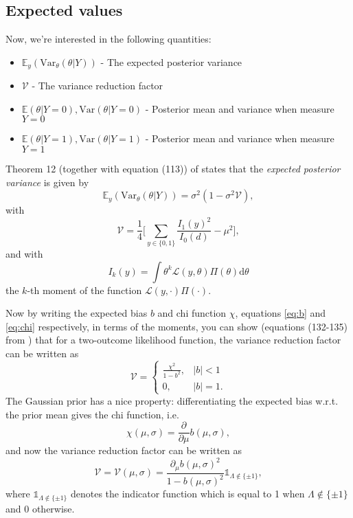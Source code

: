 \documentclass[]{report}
\begin{document}
\subsection{Expected values}
Now, we're interested in the following quantities:
\begin{itemize}
    \item $\mathbb{E}_y(\text{Var}_{\theta}(\theta | Y))$ - The expected posterior variance
    \item $\mathcal{V}$ - The variance reduction factor
    \item $\mathbb{E}(\theta | Y=0), \text{Var}(\theta|Y=0)$ - Posterior mean and variance when measure $Y=0$
    \item $\mathbb{E}(\theta | Y=1), \text{Var}(\theta|Y=1)$ - Posterior mean and variance when measure $Y=1$
\end{itemize}

Theorem 12 (together with equation (113)) of \cite{Koh2020} states that the \textit{expected posterior variance} is given by
\begin{equation}
    \mathbb{E}_y(\text{Var}_{\theta}(\theta | Y)) = \sigma^2(1-\sigma^2\mathcal{V}),
\end{equation}
with
\begin{equation}
    \mathcal{V} = \frac{1}{4}\Bigg[ \sum_{y\in \{0,1\}}\frac{I_1(y)^2}{I_0(d)} - \mu^2\Bigg],
\end{equation}
and with
\begin{equation}
    I_k(y) = \int \theta^k \mathcal{L}(y, \theta)\Pi(\theta) \text{d}\theta
\end{equation}
the $k$-th moment of the function $\mathcal{L}(y, \cdot)\Pi(\cdot)$.

Now by writing the expected bias $b$ and chi function $\chi$, equations \eqref{eq:b} and \eqref{eq:chi} respectively, in terms of the moments, you can show (equations (132-135) from \cite{Koh2020}) that for a two-outcome likelihood function, the variance reduction factor can be written as
\begin{equation}
    \mathcal{V} = \begin{cases}
        \frac{\chi^2}{1-b^2},   & |b|<1\\
        0,                      & |b|=1.
    \end{cases}
\end{equation}
The Gaussian prior has a nice property: differentiating the expected bias w.r.t. the prior mean gives the chi function, i.e.
\begin{equation}
    \chi(\mu, \sigma) = \frac{\partial}{\partial\mu}b(\mu, \sigma),
\end{equation}
and now the variance reduction factor can be written as
\begin{equation}
    \mathcal{V} = \mathcal{V}(\mu, \sigma) = \frac{\partial_{\mu}b(\mu, \sigma)^2}{1 - b(\mu, \sigma)^2} \mathbb{1}_{\Lambda \notin \{\pm1\}},
\end{equation}
where $\mathbb{1}_{\Lambda \notin \{\pm1\}}$ denotes the indicator function which is equal to 1 when $\Lambda \notin \{\pm1\}$ and $0$ otherwise.
\end{document}
